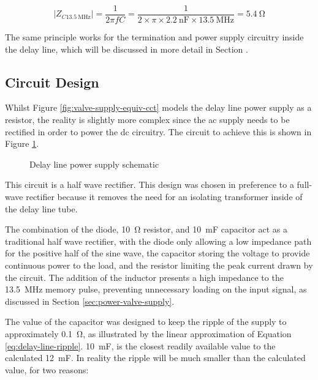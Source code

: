 \begin{equation}
| Z_{C\SI{13.5}{\mega\hertz}} | = \frac{1}{2 \pi f C} = \frac{1}{2 \times \pi \times \SI{2.2}{\nano\farad} \times \SI{13.5}{\mega\hertz}} = \SI{5.4}{\ohm} \label{eq:pulse-c-impedance} 
\end{equation}

The same principle works for the termination and power supply circuitry inside the delay line, which will be discussed in more detail in Section .

\subsection{Circuit Design}

Whilst Figure \ref{fig:valve-supply-equiv-cct} models the delay line power supply as a resistor, the reality is slightly more complex since the \gls{ac} supply needs to be rectified in order to power the \gls{dc} circuitry. The circuit to achieve this is shown in Figure \ref{fig:delay-line-psu-sch}.

\begin{figure}[ht]
	\centering
	\caption{Delay line power supply schematic }
	\label{fig:delay-line-psu-sch}
\end{figure}

This circuit is a half wave rectifier. This design was chosen in preference to a full-wave rectifier because it removes the need for an isolating transformer inside of the delay line tube.

The combination of the diode, \SI{10}{\ohm} resistor, and \SI{10}{\milli\farad} capacitor act as a traditional half wave rectifier, with the diode only allowing a low impedance path for the positive half of the sine wave, the capacitor storing the voltage to provide continuous power to the load, and the resistor limiting the peak current drawn by the circuit. The addition of the inductor presents a high impedance to the \SI{13.5}{\mega\hertz} memory pulse, preventing unnecessary loading on the input signal, as discussed in Section \ref{sec:power-valve-supply}.

The value of the capacitor was designed to keep the ripple of the supply to approximately \SI{0.1}{\ohm}, as illustrated by the linear approximation of Equation \ref{eq:delay-line-ripple}. \SI{10}{\milli\farad}, is the closest readily available value to the calculated \SI{12}{\milli\farad}. In reality the ripple will be much smaller than the calculated value, for two reasons:

